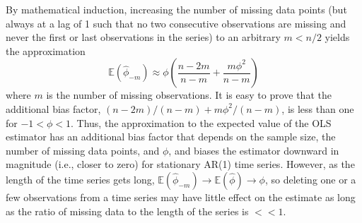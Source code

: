 By mathematical induction, increasing the number of missing data points (but always at a lag of 1 such that no two consecutive observations are missing and never the first or last observations in the series) to an arbitrary $m < n/2$ yields the approximation
\begin{equation*}
    \mathbb{E}(\hat \phi_{-m}) \approx \phi \left(\frac{n - 2m}{n - m} + \frac{m\phi^2}{n - m} \right)
\end{equation*}
where $m$ is the number of missing observations. It is easy to prove that the additional bias factor, $(n - 2m)/(n - m) + m\phi^2/(n - m)$, is less than one for $-1 < \phi < 1$. Thus, the approximation to the expected value of the OLS estimator has an additional bias factor that depends on the sample size, the number of missing data points, and $\phi$, and biases the estimator downward in magnitude (i.e., closer to zero) for stationary AR(1) time series. However, as the length of the time series gets long, $\mathbb{E}(\hat \phi_{-m}) \to \mathbb{E}(\hat \phi) \to \phi$, so deleting one or a few observations from a time series may have little effect on the estimate as long as the ratio of missing data to the length of the series is $<< 1$.





